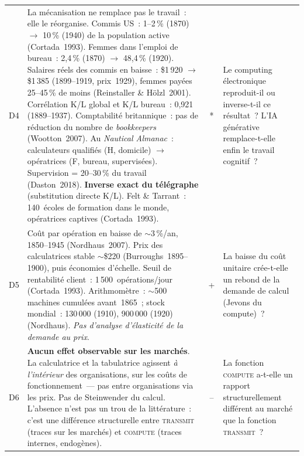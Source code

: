 \begin{table}[p]
\begin{tabularx}{\textwidth}{@{}cXcp{4.5cm}@{}}
D4 &
La mécanisation ne remplace pas le travail~: elle le réorganise. Commis US~: 1--2\,\% (1870) $\rightarrow$ 10\,\% (1940) de la population active (Cortada~1993). Femmes dans l'emploi de bureau~: 2,4\,\% (1870) $\rightarrow$ 48,4\,\% (1920). Salaires réels des commis en baisse~: \$1\,920 $\rightarrow$ \$1\,385 (1899--1919, prix~1929), femmes payées 25--45\,\% de moins (Reinstaller \& Hölzl~2001). Corrélation K/L global et K/L bureau~: 0,921 (1889--1937). Comptabilité britannique~: pas de réduction du nombre de \emph{bookkeepers} (Wootton~2007). Au \emph{Nautical Almanac}~: calculateurs qualifiés (H, domicile) $\rightarrow$ opératrices (F, bureau, supervisées). Supervision = 20--30\,\% du travail (Daston~2018). \textbf{Inverse exact du télégraphe} (substitution directe K/L). Felt \& Tarrant~: 140~écoles de formation dans le monde, opératrices captives (Cortada~1993). & * &
Le computing électronique reproduit-il ou inverse-t-il ce résultat~? L'IA générative remplace-t-elle enfin le travail cognitif~? \\[4pt]

D5 &
Coût par opération en baisse de $\sim$3\,\%/an, 1850--1945 (Nordhaus~2007). Prix des calculatrices stable $\sim$\$220 (Burroughs~1895--1900), puis économies d'échelle. Seuil de rentabilité client~: 1\,500~opérations/jour (Cortada~1993). Arithmomètre~: $\sim$500 machines cumulées avant~1865~; stock mondial~: 130\,000 (1910), 900\,000 (1920) (Nordhaus). \emph{Pas d'analyse d'élasticité de la demande au prix}. & + &
La baisse du coût unitaire crée-t-elle un rebond de la demande de calcul (Jevons du compute)~? \\[4pt]

D6 &
\textbf{Aucun effet observable sur les marchés}. La calculatrice et la tabulatrice agissent \emph{à l'intérieur} des organisations, sur les coûts de fonctionnement~--- pas entre organisations via les prix. Pas de Steinwender du calcul. L'absence n'est pas un trou de la littérature~: c'est une différence structurelle entre \textsc{transmit} (traces sur les marchés) et \textsc{compute} (traces internes, endogènes). & -- &
La fonction \textsc{compute} a-t-elle un rapport structurellement différent au marché que la fonction \textsc{transmit}~? \\[4pt]


\end{tabularx}
\end{table}

